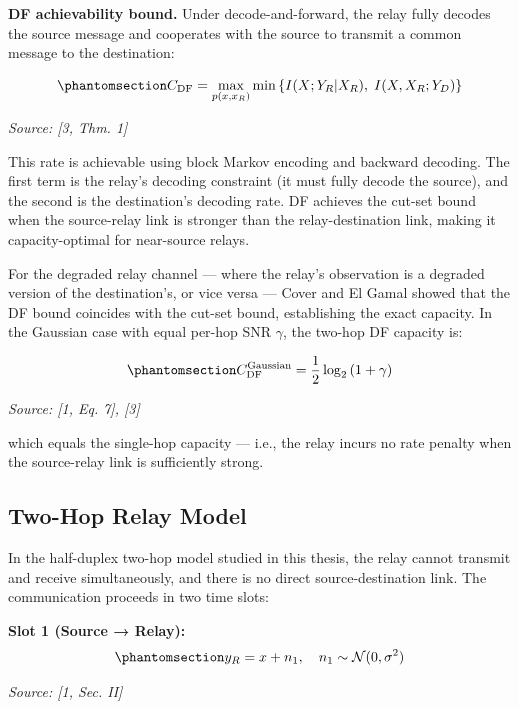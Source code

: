 \textbf{DF achievability bound.} Under decode-and-forward, the relay fully decodes the source message and cooperates with the source to transmit a common message to the destination:

\begin{equation}\protect\phantomsection\label{eq:df-capacity}{C_{\text{DF}} = \max_{p(x, x_R)} \min\left\{I(X; Y_R | X_R), \; I(X, X_R; Y_D)\right\}
}\end{equation} \par{\small\textit{Source: [3, Thm. 1]}}

This rate is achievable using block Markov encoding and backward decoding. The first term is the relay's decoding constraint (it must fully decode the source), and the second is the destination's decoding rate. DF achieves the cut-set bound when the source-relay link is stronger than the relay-destination link, making it capacity-optimal for near-source relays.

For the degraded relay channel --- where the relay's observation is a degraded version of the destination's, or vice versa --- Cover and El Gamal showed that the DF bound coincides with the cut-set bound, establishing the exact capacity. In the Gaussian case with equal per-hop SNR \(\gamma\), the two-hop DF capacity is:

\begin{equation}\protect\phantomsection\label{eq:df-gaussian-capacity}{C_{\text{DF}}^{\text{Gaussian}} = \frac{1}{2}\log_2\left(1 + \gamma\right)
}\end{equation} \par{\small\textit{Source: [1, Eq. 7], [3]}}

which equals the single-hop capacity --- i.e., the relay incurs no rate penalty when the source-relay link is sufficiently strong.

\subsection{Two-Hop Relay Model}\label{sec:two-hop-relay-model}

In the half-duplex two-hop model studied in this thesis, the relay cannot transmit and receive simultaneously, and there is no direct source-destination link. The communication proceeds in two time slots:

\textbf{Slot 1 (Source → Relay):} \begin{equation}\protect\phantomsection\label{eq:awgn-hop1}{y_R = x + n_1, \quad n_1 \sim \mathcal{N}(0, \sigma^2)
}\end{equation} \par{\small\textit{Source: [1, Sec. II]}}

